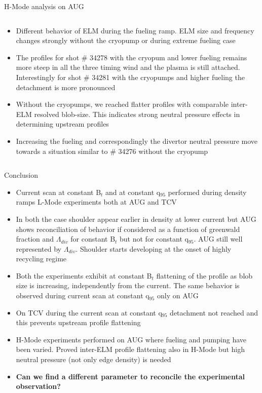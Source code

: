 \documentclass[10pt, compress]{beamer}
\newcommand\Fontvi{\fontsize{8}{7.2}\selectfont}
\begin{document}
\begin{frame}{H-Mode analysis on AUG}
\begin{columns}
\begin{column}{0.45\textwidth}
\begin{itemize}
    \item<2|only@2> Different behavior of ELM during the fueling
      ramp. ELM size and frequency changes strongly without the
      cryopump or during extreme fueling case
    \item<3|only@3> The profiles for shot \# 34278 with the cryopum
      and lower fueling remains more steep in all the three timing
      wind and the plasma is still attached. Interestingly for shot \#
      34281 with the cryopumps and higher fueling the detachment is
      more pronounced
    \item<4|only@4> Without the cryopumps, we reached flatter
         profiles with comparable inter-ELM resolved blob-size. This
         indicates strong neutral pressure effects in determining
         upstream profiles
    \item<5|only@5> Increasing the fueling and correspondingly the
      divertor neutral pressure move towards a situation similar to
      \# 34276 without the cryopump
      \end{itemize}
  \end{column}
\end{columns}
\end{frame}

\begin{frame}{Conclusion}
  \Fontvi
  \begin{itemize}
    \item Current scan at constant B$_t$ and at constant q$_{95}$
      performed during density ramps L-Mode experiments both at AUG
      and TCV
    \item In both the case shoulder appear earlier in density at lower
      current but AUG shows reconciliation of behavior if considered
      as a function of greenwald fraction and $\Lambda_{div}$ for
      constant B$_t$ but not for constant q$_{95}$. AUG still well
      represented by $\Lambda_{div}$. \alert{Shoulder starts
        developing at the onset of highly recycling regime}
    \item Both the experiments exhibit at constant B$_t$ flattening of the profile as
      blob size is increasing, independently from the current. The
      same behavior is observed during current scan at constant
      q$_{95}$ \alert{only on AUG}
    \item On TCV during the current scan at constant q$_{95}$
      detachment not reached and this \alert{prevents upstream profile
        flattening}
    \item H-Mode experiments performed on AUG where fueling and
      pumping have been varied. \alert{Proved inter-ELM profile flattening
      also in H-Mode} \alert{but high neutral pressure (not only edge
      density) is needed}
  \item<2-> \textbf{\textcolor{ta3scarletred}{Can we find a different parameter to reconcile
        the experimental observation?}}
  \end{itemize}
\end{frame}
\end{document}
